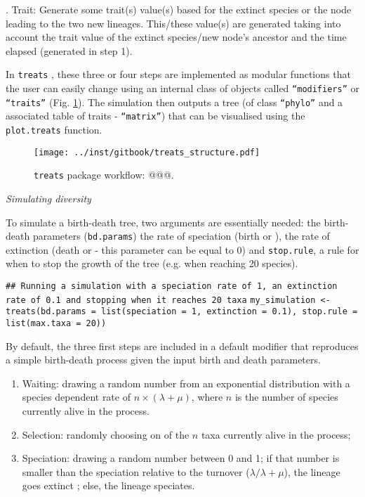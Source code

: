 \documentclass[12pt,letterpaper]{article}
\renewcommand{\subsection}[1]{%
\bigskip
\begin{center}
\begin{large}
\normalfont\itshape #1
\end{large}
\end{center}}
\newcommand{\treats}{\texttt{treats} }
\begin{document}
. Trait: Generate some trait(s) value(s) based for the extinct species or the node leading to the two new lineages.
This/these value(s) are generated taking into account the trait value of the extinct species/new node's ancestor and the time elapsed (generated in step 1).

In \treats, these three or four steps are implemented as modular functions that the user can easily change using an internal class of objects called \texttt{``modifiers''} or \texttt{``traits''} (Fig. \ref{Fig:workflow}).
The simulation then outputs a tree (of class \texttt{``phylo''} and a associated table of traits - \texttt{``matrix''}) that can be visualised using the \texttt{plot.treats} function.

\begin{figure}[!htbp]
\centering
   \texttt{[image: ../inst/gitbook/treats\_structure.pdf]} 
\caption{\treats package workflow: @@@.}
\label{Fig:workflow}
\end{figure}

\subsection{Simulating diversity}

To simulate a birth-death tree, two arguments are essentially needed: the birth-death parameters (\texttt{bd.params}) the rate of speciation (birth or \lambda), the rate of extinction (death or \mu - this parameter can be equal to 0) and \texttt{stop.rule}, a rule for when to stop the growth of the tree (e.g. when reaching 20 species).

\texttt{## Running a simulation with a speciation rate of 1, an extinction rate of 0.1 and stopping when it reaches 20 taxa}
\texttt{my_simulation <- treats(bd.params = list(speciation = 1, extinction = 0.1), stop.rule = list(max.taxa = 20))}

By default, the three first steps are included in a default modifier that reproduces a simple birth-death process given the input birth and death parameters.

\begin{enumerate}
    \item Waiting: drawing a random number from an exponential distribution with a species dependent rate of $n \times (\lambda + \mu)$, where $n$ is the number of species currently alive in the process.
    \item Selection: randomly choosing on of the $n$ taxa currently alive in the process;
    \item Speciation: drawing a random number between 0 and 1; if that number is smaller than the speciation relative to the turnover ($\lambda / \lambda+\mu$), the lineage goes extinct %
    ; else, the lineage speciates.
\end{enumerate}
\end{document}
